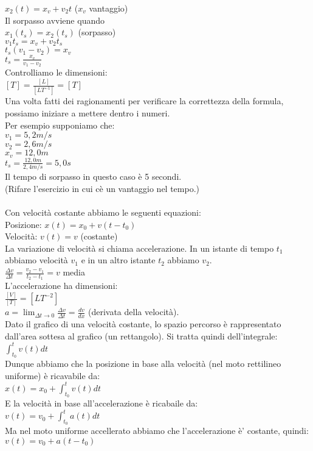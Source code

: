 \documentclass{article}
\begin{document}
$x_2(t)=x_v+v_2t$ ($x_v$ vantaggio)\\
Il sorpasso avviene quando \\$x_1(t_s)=x_2(t_s)$ (sorpasso)\\
$v_1t_s=x_v+v_2t_s$\\
$t_s(v_1-v_2)=x_v$\\
$t_s=\frac{x_v}{v_1-v_2}$\\
Controlliamo le dimensioni:\\
$[T]=\frac{[L]}{[LT^{-1}]}=[T]$\\
Una volta fatti dei ragionamenti per verificare la correttezza
della formula, possiamo iniziare a mettere dentro i numeri.\\
Per esempio supponiamo che:\\
$v_1=5,2m\slash s$\\
$v_2=2,6m\slash s$\\
$x_v=12,0 m$\\
$t_s=\frac{12,0m}{2,4m\slash s}=5,0 s$\\
Il tempo di sorpasso in questo caso \`{e} 5 secondi.\\
(Rifare l'esercizio in cui c\`{e} un vantaggio nel tempo.)\\
\\
Con velocit\`{a} costante abbiamo le seguenti equazioni:\\
Posizione: $x(t)=x_0+v(t-t_0)$\\
Velocit\`{a}: $v(t)=v$ (costante)\\
La variazione di velocit\`{a} si chiama accelerazione. In un
istante di tempo $t_1$ abbiamo velocit\`{a} $v_1$ e in un altro istante
$t_2$ abbiamo $v_2$.\\
$\frac{\Delta v}{\Delta t}=\frac{v_2-v_1}{t_2-t_1}=v$ media\\
L'accelerazione ha dimensioni:\\
$\frac{[V]}{[T]}=[LT^{-2}]$\\
$a=\lim_{\Delta t\to 0}\frac{\Delta v}{\Delta t}=\frac{dv}{dx}$ (derivata della
velocit\`{a}).\\
Dato il grafico di una velocit\`{a} costante, lo spazio percorso
\`{e} rappresentato dall'area sottesa al grafico (un rettangolo). Si tratta
quindi dell'integrale:\\
$\int_{t_0}^{t}v(t) dt$\\
Dunque abbiamo che la posizione in base alla velocit\`{a} (nel moto rettilineo uniforme) \`{e} ricavabile da:\\
$x(t)=x_0+\int_{t_0}^{t}v(t) dt$\\
E la velocit\`{a} in base all'accelerazione \`{e} ricabaile da:\\
$v(t)=v_0+\int_{t_0}^{t}a(t) dt$\\
Ma nel moto uniforme accellerato abbiamo che l'accelerazione
\`{e}' costante, quindi:\\
$v(t)=v_0+a(t-t_0)$\\
\end{document}
